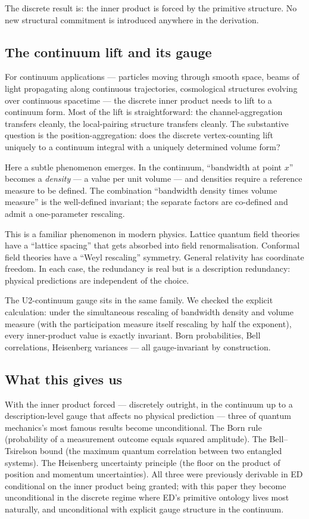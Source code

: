 \documentclass[11pt,a4paper]{article}
\begin{document}
The discrete result is: the inner product is forced by the primitive structure. No new structural commitment is introduced anywhere in the derivation.

\subsection{The continuum lift and its gauge}

For continuum applications --- particles moving through smooth space, beams of light propagating along continuous trajectories, cosmological structures evolving over continuous spacetime --- the discrete inner product needs to lift to a continuum form. Most of the lift is straightforward: the channel-aggregation transfers cleanly, the local-pairing structure transfers cleanly. The substantive question is the position-aggregation: does the discrete vertex-counting lift uniquely to a continuum integral with a uniquely determined volume form?

Here a subtle phenomenon emerges. In the continuum, ``bandwidth at point $x$'' becomes a \emph{density} --- a value per unit volume --- and densities require a reference measure to be defined. The combination ``bandwidth density times volume measure'' is the well-defined invariant; the separate factors are co-defined and admit a one-parameter rescaling.

This is a familiar phenomenon in modern physics. Lattice quantum field theories have a ``lattice spacing'' that gets absorbed into field renormalisation. Conformal field theories have a ``Weyl rescaling'' symmetry. General relativity has coordinate freedom. In each case, the redundancy is real but is a description redundancy: physical predictions are independent of the choice.

The U2-continuum gauge sits in the same family. We checked the explicit calculation: under the simultaneous rescaling of bandwidth density and volume measure (with the participation measure itself rescaling by half the exponent), every inner-product value is exactly invariant. Born probabilities, Bell correlations, Heisenberg variances --- all gauge-invariant by construction.

\subsection{What this gives us}

With the inner product forced --- discretely outright, in the continuum up to a description-level gauge that affects no physical prediction --- three of quantum mechanics's most famous results become unconditional. The Born rule (probability of a measurement outcome equals squared amplitude). The Bell--Tsirelson bound (the maximum quantum correlation between two entangled systems). The Heisenberg uncertainty principle (the floor on the product of position and momentum uncertainties). All three were previously derivable in ED conditional on the inner product being granted; with this paper they become unconditional in the discrete regime where ED's primitive ontology lives most naturally, and unconditional with explicit gauge structure in the continuum.
\end{document}
